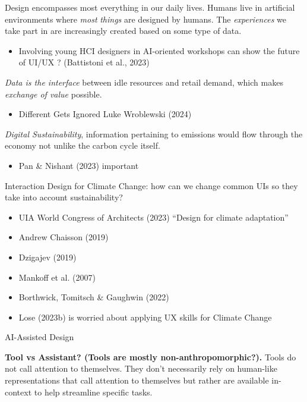 \documentclass[
  letterpaper,
  DIV=11,
  numbers=noendperiod]{scrartcl}
\providecommand{\tightlist}{%
  \setlength{\itemsep}{0pt}\setlength{\parskip}{0pt}}\usepackage{longtable,booktabs,array}
\begin{document}
Design encompasses most everything in our daily lives. Humans live in
artificial environments where \emph{most} \emph{things} are designed by
humans. The \emph{experiences} we take part in are increasingly created
based on some type of data.

\begin{itemize}
\tightlist
\item
  Involving young HCI designers in AI-oriented workshops can show the
  future of UI/UX ? (Battistoni et al., 2023)
\end{itemize}

\emph{Data is the interface} between idle resources and retail demand,
which makes \emph{exchange of value} possible.

\begin{itemize}
\tightlist
\item
  Different Gets Ignored Luke Wroblewski (2024)
\end{itemize}

\emph{Digital Sustainability}, information pertaining to emissions would
flow through the economy not unlike the carbon cycle itself.

\begin{itemize}
\tightlist
\item
  Pan \& Nishant (2023) important
\end{itemize}

Interaction Design for Climate Change: how can we change common UIs so
they take into account sustainability?

\begin{itemize}
\tightlist
\item
  UIA World Congress of Architects (2023) ``Design for climate
  adaptation''
\item
  Andrew Chaisson (2019)
\item
  Dzigajev (2019)
\item
  Mankoff et al. (2007)
\item
  Borthwick, Tomitsch \& Gaughwin (2022)
\item
  Lose (2023b) is worried about applying UX skills for Climate Change
\end{itemize}

AI-Assisted Design

\textbf{Tool vs Assistant? (Tools are mostly non-anthropomorphic?).}
Tools do not call attention to themselves. They don't necessarily rely
on human-like representations that call attention to themselves but
rather are available in-context to help streamline specific tasks.
\end{document}
